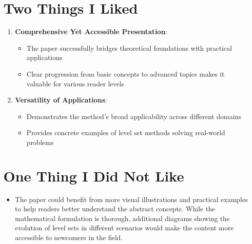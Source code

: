 \documentclass[12pt]{article}
\begin{document}
\section{Two Things I Liked}
\begin{enumerate}[noitemsep]
    \item \textbf{Comprehensive Yet Accessible Presentation}:
    \begin{itemize}[noitemsep]
        \item The paper successfully bridges theoretical foundations with practical applications
        \item Clear progression from basic concepts to advanced topics makes it valuable for various reader levels
    \end{itemize}
    \item \textbf{Versatility of Applications}:
    \begin{itemize}[noitemsep]
        \item Demonstrates the method's broad applicability across different domains
        \item Provides concrete examples of level set methods solving real-world problems
    \end{itemize}
\end{enumerate}

\section{One Thing I Did Not Like}
\begin{itemize}[noitemsep]
    \item The paper could benefit from more visual illustrations and practical examples to help readers better understand the abstract concepts. While the mathematical formulation is thorough, additional diagrams showing the evolution of level sets in different scenarios would make the content more accessible to newcomers in the field.
\end{itemize}
\end{document}
